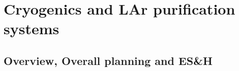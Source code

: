 








\section{Cryogenics and LAr purification systems}
\label{sec:cryo-purif}

\subsection{Overview, Overall planning and ES\&H}

